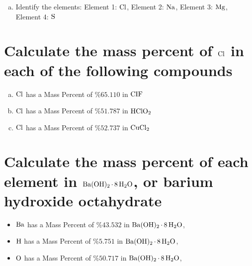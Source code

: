 \documentclass[11pt]{article}
\begin{document}
\begin{enumerate}[(a)]
\item Identify the elements: Element 1: \(\ce{Cl}\), Element 2: \(\ce{Na}\), Element 3: \(\ce{Mg}\), Element 4: \(\ce{S}\)
\end{enumerate}

\section{Calculate the mass percent of \(\ce{Cl}\) in each of the following compounds}
\label{sec:orgf037b0b}
\begin{enumerate}[(a)]
\item \(\ce{Cl}\)  has a Mass Percent of \%\(65.110\) in \(\ce{CIF}\)
\item \(\ce{Cl}\)  has a Mass Percent of \%\(51.787\) in \(\ce{HClO2}\)
\item \(\ce{Cl}\)  has a Mass Percent of \%\(52.737\) in \(\ce{CuCl2}\)
\end{enumerate}

\section{Calculate the mass percent of each element in \(\ce{Ba(OH)2*8H2O}\), or barium hydroxide octahydrate}
\label{sec:orgb0e9c94}
\begin{itemize}
\item \(\ce{Ba}\)  has a Mass Percent of \%\(43.532\) in \(\ce{Ba(OH)2*8H2O}\),
\item \(\ce{H}\)  has a Mass Percent of \%\(5.751\) in \(\ce{Ba(OH)2*8H2O}\),
\item \(\ce{O}\)  has a Mass Percent of \%\(50.717\) in \(\ce{Ba(OH)2*8H2O}\),
\end{itemize}
\end{document}
